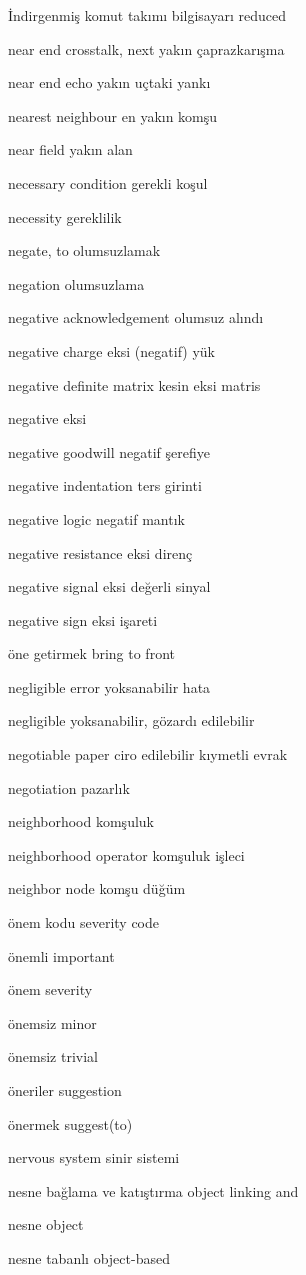 \documentclass[12pt,fleqn]{article}\usepackage{../../common}
\begin{document}
İndirgenmiş komut takımı bilgisayarı reduced

near end crosstalk, next yakın çaprazkarışma

near end echo yakın uçtaki yankı

nearest neighbour en yakın komşu

near field yakın alan

necessary condition gerekli koşul

necessity gereklilik

negate, to olumsuzlamak

negation olumsuzlama

negative acknowledgement olumsuz alındı

negative charge eksi (negatif) yük

negative definite matrix kesin eksi matris

negative eksi

negative goodwill negatif şerefiye

negative indentation ters girinti

negative logic negatif mantık

negative resistance eksi direnç

negative signal eksi değerli sinyal

negative sign eksi işareti

öne getirmek bring to front

negligible error yoksanabilir hata

negligible yoksanabilir, gözardı edilebilir

negotiable paper ciro edilebilir kıymetli evrak

negotiation pazarlık

neighborhood komşuluk

neighborhood operator komşuluk işleci

neighbor node komşu düğüm

önem kodu severity code

önemli important

önem severity

önemsiz minor

önemsiz trivial

öneriler suggestion

önermek suggest(to)

nervous system sinir sistemi

nesne bağlama ve katıştırma object linking and

nesne object

nesne tabanlı object-based
\end{document}
